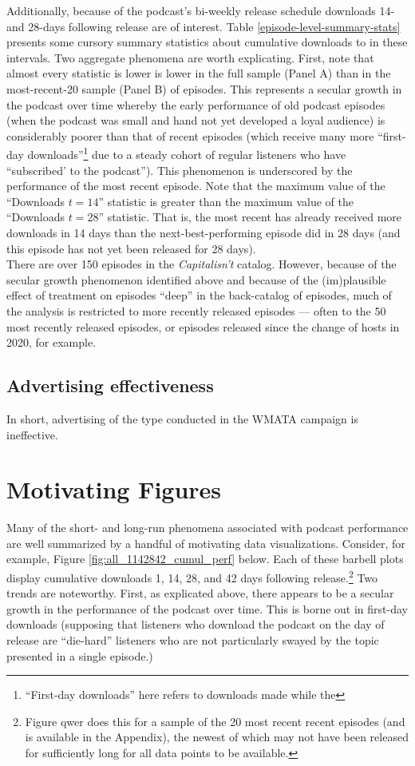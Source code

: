 \documentclass[11pt, letterpaper, twoside]{article}
\begin{document}
Additionally, because of the podcast's bi-weekly release schedule downloads 14- and 28-days following release are of interest. Table \ref{episode-level-summary-stats} presents some cursory summary statistics about cumulative downloads to in these intervals. Two aggregate phenomena are worth explicating. First, note that almost every statistic is lower is lower in the full sample (Panel A) than in the most-recent-20 sample (Panel B) of episodes. This represents a secular growth in the podcast over time whereby the early performance of old podcast episodes (when the podcast was small and hand not yet developed a loyal audience) is considerably poorer than that of recent episodes (which receive many more ``first-day downloads''\footnote{``First-day downloads'' here refers to downloads made while the } due to a steady cohort of regular listeners who have ``subscribed' to the podcast''). This phenomenon is underscored by the performance of the most recent episode. Note that the maximum value of the ``Downloads $t=14$'' statistic is greater than the maximum value of the ``Downloads $t=28$'' statistic. That is, the most recent has already received more downloads in 14 days than the next-best-performing episode did in 28 days (and this episode has not yet been released for 28 days).\\



There are over 150 episodes in the \textit{Capitalisn't} catalog. However, because of the secular growth phenomenon identified above and because of the (im)plausible effect of treatment on episodes ``deep'' in the back-catalog of episodes, much of the analysis is restricted to more recently released episodes --- often to the 50 most recently released episodes, or episodes released since the change of hosts in 2020, for example.

\subsection{Advertising effectiveness}
In short, advertising of the type conducted in the WMATA campaign is ineffective.

\section{Motivating Figures}
Many of the short- and long-run phenomena associated with podcast performance are well summarized by a handful of motivating data visualizations. Consider, for example, Figure \ref{fig:all_1142842_cumul_perf} below. Each of these barbell plots display cumulative downloads 1, 14, 28, and 42 days following release.\footnote{Figure qwer does this for a sample of the 20 most recent recent episodes (and is available in the Appendix), the newest of which may not have been released for sufficiently long for all data points to be available.} Two trends are noteworthy. First, as explicated above, there appears to be a secular growth in the performance of the podcast over time. This is borne out in first-day downloads (supposing that listeners who download the podcast on the day of release are ``die-hard'' listeners who are not particularly swayed by the topic presented in a single episode.)
\end{document}
